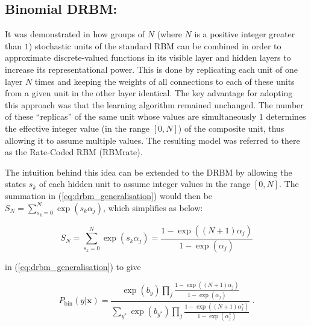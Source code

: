\documentclass[review]{elsarticle}
\begin{document}
\subsection{Binomial DRBM:}
\label{subsubsec:bin_act}
It was demonstrated in \cite{Teh2001} how groups of $N$ (where $N$ is
a positive integer greater than $1$) stochastic units of the standard
RBM can be combined in order to approximate discrete-valued functions
in its visible layer and hidden layers to increase its
representational power.  This is done by replicating each unit of one
layer $N$ times and keeping the weights of all connections to each of
these units from a given unit in the other layer identical.  The key
advantage for adopting this approach was that the learning algorithm
remained unchanged.  The number of these ``replicas'' of the same unit
whose values are simultaneously $1$ determines the effective integer
value (in the range $[0, N]$) of the composite unit, thus allowing it
to assume multiple values.  The resulting model was referred to there
as the Rate-Coded RBM (RBMrate).
            
The intuition behind this idea can be extended to the DRBM by allowing
the states $s_k$ of each hidden unit to assume integer values in the
range $[0, N]$.  The summation in (\ref{eq:drbm_generalisation}) would
then be $S_N = \sum_{s_k=0}^N \exp\left(s_k \alpha_j\right)$, which
simplifies as below:

\begin{equation}
S_N = \sum_{s_k=0}^N \exp\left(s_k \alpha_j\right) = \frac{1 - \exp\left(\left(N+1\right) \alpha_j\right)}{1 -
 \exp\left(\alpha_j\right)} 
\end{equation}

 in (\ref{eq:drbm_generalisation}) to give

 \begin{equation}
                P_{\textrm{bin}}\left(y|\mathbf{x}\right) 
                = \frac{\exp\left(b_y\right) \prod_j
                    \frac{1-\exp\left(\left(N+1\right)
                    \alpha_j\right)}{1-\exp\left(\alpha_j\right)}} 
                    {\sum_{y^{*}} \exp\left(b_{y^{*}}\right) \prod_j
                    \frac{1-\exp\left(\left(N+1\right)
                    \alpha^*_j\right)}{1-\exp\left(\alpha^*_j\right)}}\ . 
        \end{equation}
\end{document}
